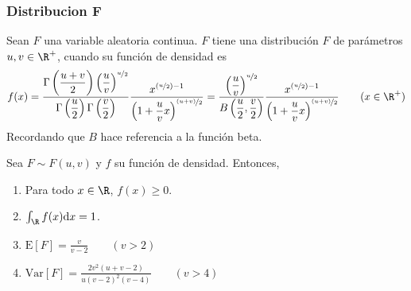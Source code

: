 \subsubsection{Distribucion F}

\begin{Def}
  Sean $F$ una variable aleatoria continua. $F$ tiene una distribución
  $F$ de parámetros $u,v\in\R^+$, cuando su función de densidad es
  \[f(x)=
  \dfrac{\Gamma\left(\frac{u+v}{2}\right)\left(\frac{u}{v}\right)^{\nicefrac{u}{2}}}
  {\Gamma\left(\frac{u}{2}\right)\Gamma\left(\frac{v}{2}\right)}
  \dfrac{x^{(\nicefrac{u}{2})-1}}
  {\left(1 + \frac{u}{v}x\right)^{\nicefrac{(u+v)}{2}}}
  =
  \dfrac{\left(\frac{u}{v}\right)^{\nicefrac{u}{2}}}
    {B\left(\frac{u}{2},\frac{v}{2}\right)}
  \dfrac{x^{(\nicefrac{u}{2})-1}}
    {\left(1 + \frac{u}{v}x\right)^{\nicefrac{(u+v)}{2}}}
  \qquad (x\in\R^+)
  \]
  Recordando que $B$ hace referencia a la función beta.
\end{Def}
\begin{Teo}
  Sea $F\sim F(u,v)$ y $f$ su función de densidad. Entonces,
  \begin{enumerate}
    \item Para todo $x\in\R$, $f(x) \geq 0$.
    \item $\int_{\R}f(x)\mathrm{d}x=1$.
    \item $\text{E}[F]=\frac{v}{v-2} \qquad(v>2)$
    \item $\text{Var}[F]=\frac{2v^2(u+v-2)}{u(v-2)^2(v-4)}\qquad(v>4)$
  \end{enumerate}
\end{Teo}
